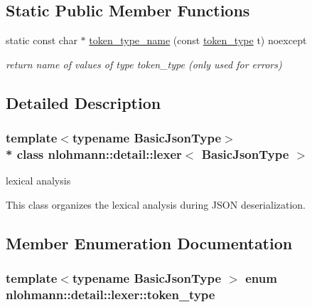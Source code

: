 \subsection*{Static Public Member Functions}
\begin{DoxyCompactItemize}
\item 
static const char $\ast$ \hyperlink{classnlohmann_1_1detail_1_1lexer_ae514e2005f0ce185f1ad366139e541e8}{token\+\_\+type\+\_\+name} (const \hyperlink{classnlohmann_1_1detail_1_1lexer_a3f313cdbe187cababfc5e06f0b69b098}{token\+\_\+type} t) noexcept\hypertarget{classnlohmann_1_1detail_1_1lexer_ae514e2005f0ce185f1ad366139e541e8}{}\label{classnlohmann_1_1detail_1_1lexer_ae514e2005f0ce185f1ad366139e541e8}

\begin{DoxyCompactList}\small\item\em return name of values of type token\+\_\+type (only used for errors) \end{DoxyCompactList}\end{DoxyCompactItemize}


\subsection{Detailed Description}
\subsubsection*{template$<$typename Basic\+Json\+Type$>$\\*
class nlohmann\+::detail\+::lexer$<$ Basic\+Json\+Type $>$}

lexical analysis 

This class organizes the lexical analysis during J\+S\+ON deserialization. 

\subsection{Member Enumeration Documentation}
\subsubsection[{\texorpdfstring{token\+\_\+type}{token_type}}]{\setlength{\rightskip}{0pt plus 5cm}template$<$typename Basic\+Json\+Type $>$ enum {\bf nlohmann\+::detail\+::lexer\+::token\+\_\+type}\hspace{0.3cm}{\ttfamily [strong]}}\hypertarget{classnlohmann_1_1detail_1_1lexer_a3f313cdbe187cababfc5e06f0b69b098}{}\label{classnlohmann_1_1detail_1_1lexer_a3f313cdbe187cababfc5e06f0b69b098}


